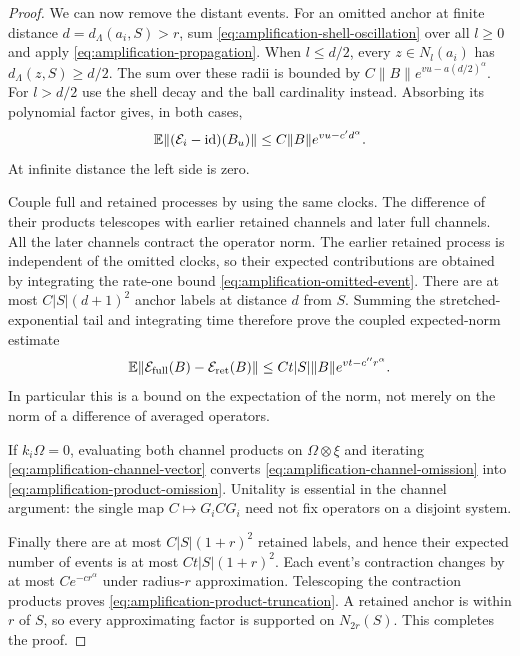 \begin{proof}
We can now remove the distant events.  For an omitted anchor at finite
distance $d=d_\Lambda(a_i,S)>r$, sum
\eqref{eq:amplification-shell-oscillation} over all $l\ge0$ and
apply \eqref{eq:amplification-propagation}.  When $l\le d/2$,
every $z\in N_l(a_i)$ has $d_\Lambda(z,S)\ge d/2$.
The sum over these radii is bounded by
$C\|B\|e^{vu-a(d/2)^\alpha}$.  For $l>d/2$ use the shell
decay and the ball cardinality instead.  Absorbing its polynomial
factor gives, in both cases,
\begin{equation}\label{eq:amplification-omitted-event}
 \mathbb E\|(\mathcal E_i-\operatorname{id})(B_u)\|
 \le C\|B\|e^{vu-c'd^\alpha}.
\end{equation}
At infinite distance the left side is zero.

Couple full and retained processes by using the same clocks.
The difference of their products telescopes with earlier retained
channels and later full channels.  All the later channels contract
the operator norm.  The earlier retained process is independent of
the omitted clocks, so their expected contributions are obtained by
integrating the rate-one bound
\eqref{eq:amplification-omitted-event}.  There are at most
$C|S|(d+1)^2$ anchor labels at distance $d$ from $S$.
Summing the stretched-exponential tail and integrating time therefore
prove the coupled expected-norm estimate
\begin{equation}\label{eq:amplification-channel-omission}
 \mathbb E\|\mathcal E_{\rm full}(B)-\mathcal E_{\rm ret}(B)\|
 \le Ct|S|\|B\|e^{vt-c''r^\alpha}.
\end{equation}
In particular this is a bound on the expectation of the norm, not
merely on the norm of a difference of averaged operators.

If $k_i\Omega=0$, evaluating both channel products on
$\Omega\otimes\xi$ and iterating
\eqref{eq:amplification-channel-vector} converts
\eqref{eq:amplification-channel-omission} into
\eqref{eq:amplification-product-omission}.  Unitality is essential
in the channel argument: the single map $C\mapsto G_iCG_i$ need
not fix operators on a disjoint system.

Finally there are at most $C|S|(1+r)^2$ retained labels, and hence
their expected number of events is at most $Ct|S|(1+r)^2$.
Each event's contraction changes by at most $Ce^{-c r^\alpha}$
under radius-$r$ approximation.  Telescoping the contraction products
proves \eqref{eq:amplification-product-truncation}.  A retained
anchor is within $r$ of $S$, so every approximating factor is supported
on $N_{2r}(S)$.  This completes the proof.
\end{proof}

